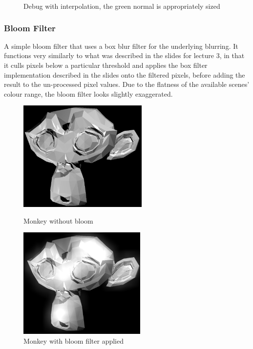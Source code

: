 \documentclass{article}
\begin{document}
\begin{figure}[!htb]
        \caption*{Debug with interpolation, the green normal is appropriately sized}
      \endminipage
    \end{figure}

    \subsubsection{Bloom Filter}
    A simple bloom filter that uses a box blur filter for the underlying blurring. It functions very similarly 
    to what was described in the slides for lecture 3, in that it culls pixels below a particular threshold 
    and applies the box filter implementation described in the slides onto the filtered pixels, before adding 
    the result to the un-processed pixel values. Due to the flatness of the available scenes' colour range,
    the bloom filter looks slightly exaggerated.

    \begin{figure}[!htb]
          \includegraphics[width=\linewidth, height=5.5cm]{images/monkey_no_bloom}
          \caption*{Monkey without bloom}
        \endminipage\hfill
          \includegraphics[width=\linewidth, height=5.5cm]{images/monkey_bloom}
          \caption*{Monkey with bloom filter applied}
        \endminipage
    \end{figure}
    
    \newpage
\end{document}
